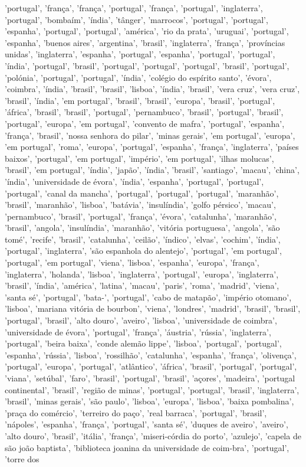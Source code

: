 \documentclass{article}
\begin{document}
\begin{itemize}
'portugal', 'frança', 'frança', 'portugal', 'frança', 'portugal', 'inglaterra', 'portugal', 'bombaím', 'índia', 'tânger', 'marrocos', 'portugal', 'portugal', 'espanha', 'portugal', 'portugal', 'américa', 'rio da prata', 'uruguai', 'portugal', 'espanha', 'buenos aires', 'argentina', 'brasil', 'inglaterra', 'frança', 'províncias unidas', 'inglaterra', 'espanha', 'portugal', 'espanha', 'portugal', 'portugal', 'índia', 'portugal', 'brasil', 'portugal', 'portugal', 'portugal', 'brasil', 'portugal', 'polónia', 'portugal', 'portugal', 'índia', 'colégio do espírito santo', 'évora', 'coimbra', 'índia', 'brasil', 'brasil', 'lisboa', 'índia', 'brasil', 'vera cruz', 'vera cruz', 'brasil', 'índia', 'em portugal', 'brasil', 'brasil', 'europa', 'brasil', 'portugal', 'áfrica', 'brasil', 'brasil', 'portugal', 'pernambuco', 'brasil', 'portugal', 'brasil', 'portugal', 'europa', 'em portugal', 'convento de mafra', 'portugal', 'espanha', 'frança', 'brasil', 'nossa senhora do pilar', 'minas gerais', 'em portugal', 'europa', 'em portugal', 'roma', 'europa', 'portugal', 'espanha', 'frança', 'inglaterra', 'países baixos', 'portugal', 'em portugal', 'império', 'em portugal', 'ilhas molucas', 'brasil', 'em portugal', 'índia', 'japão', 'índia', 'brasil', 'santiago', 'macau', 'china', 'índia', 'universidade de évora', 'índia', 'espanha', 'portugal', 'portugal', 'portugal', 'canal da mancha', 'portugal', 'portugal', 'portugal', 'maranhão', 'brasil', 'maranhão', 'lisboa', 'batávia', 'insulíndia', 'golfo pérsico', 'macau', 'pernambuco', 'brasil', 'portugal', 'frança', 'évora', 'catalunha', 'maranhão', 'brasil', 'angola', 'insulíndia', 'maranhão', 'vitória portuguesa', 'angola', 'são tomé', 'recife', 'brasil', 'catalunha', 'ceilão', 'índico', 'elvas', 'cochim', 'índia', 'portugal', 'inglaterra', 'são espanhola do alentejo', 'portugal', 'em portugal', 'portugal', 'em portugal', 'viena', 'lisboa', 'espanha', 'europa', 'frança', 'inglaterra', 'holanda', 'lisboa', 'inglaterra', 'portugal', 'europa', 'inglaterra', 'brasil', 'índia', 'américa', 'latina', 'macau', 'paris', 'roma', 'madrid', 'viena', 'santa sé', 'portugal', 'bata-', 'portugal', 'cabo de matapão', 'império otomano', 'lisboa', 'mariana vitória de bourbon', 'viena', 'londres', 'madrid', 'brasil', 'brasil', 'portugal', 'brasil', 'alto douro', 'aveiro', 'lisboa', 'universidade de coimbra', 'universidade de évora', 'portugal', 'frança', 'áustria', 'rússia', 'inglaterra', 'portugal', 'beira baixa', 'conde alemão lippe', 'lisboa', 'portugal', 'portugal', 'espanha', 'rússia', 'lisboa', 'rossilhão', 'catalunha', 'espanha', 'frança', 'olivença', 'portugal', 'europa', 'portugal', 'atlântico', 'áfrica', 'brasil', 'portugal', 'portugal', 'viana', 'setúbal', 'faro', 'brasil', 'portugal', 'brasil', 'açores', 'madeira', 'portugal continental', 'brasil', 'região de minas', 'portugal', 'portugal', 'brasil', 'inglaterra', 'brasil', 'minas gerais', 'são paulo', 'lisboa', 'europa', 'lisboa', 'baixa pombalina', 'praça do comércio', 'terreiro do paço', 'real barraca', 'portugal', 'brasil', 'nápoles', 'espanha', 'frança', 'portugal', 'santa sé', 'duques de aveiro', 'aveiro', 'alto douro', 'brasil', 'itália', 'frança', 'miseri-córdia do porto', 'azulejo', 'capela de são joão baptista', 'biblioteca joanina da universidade de coim-bra', 'portugal', 'torre dos 
\end{itemize}
\end{document}
